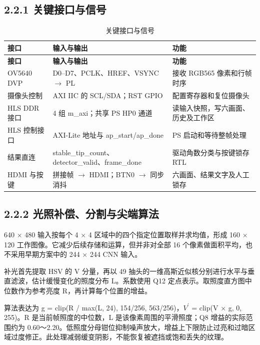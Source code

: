 \documentclass[UTF8,fontset=windows,a4paper,11pt]{ctexart}
\begin{document}
\subsection*{2.2.1 关键接口与信号}

\begin{center}
\begingroup
\fontsize{8.5}{11}\selectfont
\setlength{\tabcolsep}{3pt}
\renewcommand{\arraystretch}{1.22}
\begin{longtable}{@{}p{2.930cm}p{5.388cm}p{5.483cm}@{}}
\caption{关键接口与信号}\\
\toprule
\textbf{接口} & \textbf{输入与输出} & \textbf{功能} \\
\midrule
\endfirsthead
\toprule
\textbf{接口} & \textbf{输入与输出} & \textbf{功能} \\
\midrule
\endhead
\bottomrule
\endfoot
OV5640 DVP & D0–D7、PCLK、HREF、VSYNC $\rightarrow$ PL & 接收 RGB565 像素和行帧时序 \\
摄像头控制 & AXI IIC 的 SCL/SDA；RST GPIO & 配置寄存器和复位摄像头 \\
HLS DDR 接口 & 4 组 m\_axi；共享 PS HP0 通道 & 读输入快照，写六画面、历史及工作区 \\
HLS 控制接口 & AXI-Lite 地址与 ap\_start/ap\_done & PS 启动和等待整帧处理 \\
结果直连 & stable\_tip\_count、detector\_valid、frame\_done & 驱动角数分类与按键锁存 RTL \\
HDMI 与按键 & 拼接帧 $\rightarrow$ HDMI；BTN0 $\rightarrow$ 同步消抖 & 六画面、结果文字及人工锁存 \\
\end{longtable}
\endgroup
\end{center}

\subsection*{2.2.2 光照补偿、分割与尖端算法}

640 × 480 输入按每个 4 × 4 区域中的四个指定位置取样并求均值，形成 160 × 120 工作图像。它减少后续存储和运算，但并非对全部 16 个像素做面积平均，也不采用早期方案中的 244 × 244 CNN 输入。\par

补光首先提取 HSV 的 V 分量，再以 49 抽头的一维高斯近似核分别进行水平与垂直滤波，估计缓慢变化的照度分布 L。系数使用 Q12 定点表示。取照度直方图中位数作为参考亮度 R，再计算每个位置的增益。\par

算法表达为 g = clip(R / max(L, 24), 154/256, 563/256)，$V^{\prime}$ = clip(V × g, 0, 255)。R 是当前帧照度的中位数，L 是该像素周围的平滑照度；Q8 增益的实际范围约为 0.60～2.20。低照度分母钳位抑制噪声放大，增益上下限防止过亮和过暗区域过度修正。此处理减弱缓变阴影，不能恢复被遮挡或饱和丢失的纹理。\par
\end{document}
